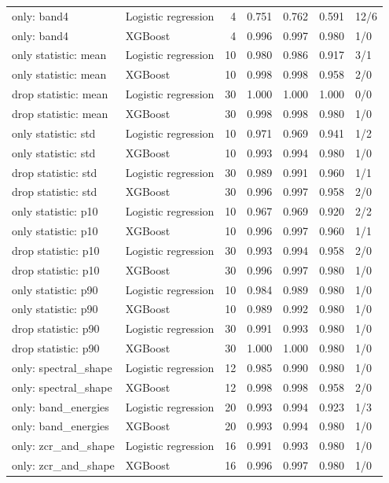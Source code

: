 \documentclass[10pt,a4paper]{article}
\begin{document}
\begin{center}
\begin{longtable}{llrrrrl}
only: band4 & Logistic regression & 4 & 0.751 & 0.762 & 0.591 & 12/6\\
only: band4 & XGBoost & 4 & 0.996 & 0.997 & 0.980 & 1/0\\
only statistic: mean & Logistic regression & 10 & 0.980 & 0.986 & 0.917 & 3/1\\
only statistic: mean & XGBoost & 10 & 0.998 & 0.998 & 0.958 & 2/0\\
drop statistic: mean & Logistic regression & 30 & 1.000 & 1.000 & 1.000 & 0/0\\
drop statistic: mean & XGBoost & 30 & 0.998 & 0.998 & 0.980 & 1/0\\
only statistic: std & Logistic regression & 10 & 0.971 & 0.969 & 0.941 & 1/2\\
only statistic: std & XGBoost & 10 & 0.993 & 0.994 & 0.980 & 1/0\\
drop statistic: std & Logistic regression & 30 & 0.989 & 0.991 & 0.960 & 1/1\\
drop statistic: std & XGBoost & 30 & 0.996 & 0.997 & 0.958 & 2/0\\
only statistic: p10 & Logistic regression & 10 & 0.967 & 0.969 & 0.920 & 2/2\\
only statistic: p10 & XGBoost & 10 & 0.996 & 0.997 & 0.960 & 1/1\\
drop statistic: p10 & Logistic regression & 30 & 0.993 & 0.994 & 0.958 & 2/0\\
drop statistic: p10 & XGBoost & 30 & 0.996 & 0.997 & 0.980 & 1/0\\
only statistic: p90 & Logistic regression & 10 & 0.984 & 0.989 & 0.980 & 1/0\\
only statistic: p90 & XGBoost & 10 & 0.989 & 0.992 & 0.980 & 1/0\\
drop statistic: p90 & Logistic regression & 30 & 0.991 & 0.993 & 0.980 & 1/0\\
drop statistic: p90 & XGBoost & 30 & 1.000 & 1.000 & 0.980 & 1/0\\
only: spectral\_shape & Logistic regression & 12 & 0.985 & 0.990 & 0.980 & 1/0\\
only: spectral\_shape & XGBoost & 12 & 0.998 & 0.998 & 0.958 & 2/0\\
only: band\_energies & Logistic regression & 20 & 0.993 & 0.994 & 0.923 & 1/3\\
only: band\_energies & XGBoost & 20 & 0.993 & 0.994 & 0.980 & 1/0\\
only: zcr\_and\_shape & Logistic regression & 16 & 0.991 & 0.993 & 0.980 & 1/0\\
only: zcr\_and\_shape & XGBoost & 16 & 0.996 & 0.997 & 0.980 & 1/0\\
\end{longtable}\end{center}
\end{document}
